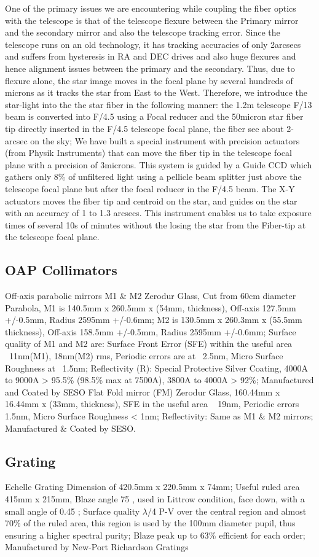 \documentclass[12pt,preprint]{emulateapj}
\begin{document}
One of the primary issues we are encountering while coupling the fiber optics with the telescope is
that of the telescope flexure between the Primary mirror and the secondary mirror and also the telescope
tracking error. Since the telescope runs on an old technology, it has tracking accuracies of only 2arcsecs
and suffers from hysteresis in RA and DEC drives and also huge flexures and hence alignment issues between
the primary and the secondary. Thus, due to flexure alone, the star image moves in the focal plane by several
hundreds of microns as it tracks the star from East to the West. Therefore, we introduce the star-light into the
the star fiber in the following manner: the 1.2m telescope F/13 beam is converted into F/4.5 using a Focal reducer 
and the 50micron star fiber tip directly inserted in the F/4.5 telescope focal plane, the fiber see about 2-arcsec on the sky;
We have built a special instrument with precision actuators (from Physik Instruments) that can move the fiber tip in the telescope focal plane with a precision of 3microns. This system is guided by a Guide CCD which gathers only 8\% of unfiltered light using 
a pellicle beam splitter just above the telescope focal plane but after the focal reducer in the F/4.5 beam. 
The X-Y actuators moves the fiber tip and centroid on the star, and guides on the star with an accuracy of 1 to 1.3 arcsecs.
This instrument enables us to take exposure times of several 10s of minutes without the losing the star from the 
Fiber-tip at the telescope focal plane.
\subsection{OAP Collimators}
Off-axis parabolic mirrors M1 \& M2 Zerodur Glass, Cut from 60cm diameter Parabola, M1 is 140.5mm x 260.5mm x (54mm, thickness), Off-axis 127.5mm +/-0.5mm, Radius 2595mm +/-0.6mm; M2 is 130.5mm x 260.3mm x (55.5mm thickness), Off-axis 158.5mm +/-0.5mm, Radius 2595mm +/-0.6mm;
Surface quality of M1 and M2 are: Surface Front Error (SFE) within the useful area ~11nm(M1), 18nm(M2) rms, Periodic errors are at ~2.5nm, Micro Surface Roughness at ~1.5nm; Reflectivity (R): Special Protective Silver Coating, 4000A to 9000A > 95.5\% (98.5\% max at 7500A), 3800A to 4000A > 92\%; Manufactured and Coated by SESO
Flat Fold mirror (FM)   Zerodur Glass, 160.44mm x 16.44mm x (33mm, thickness), SFE in the useful area ~ 19nm, Periodic errors ~ 1.5nm, Micro Surface Roughness < 1nm; Reflectivity: Same as M1 \& M2 mirrors; Manufactured \& Coated by SESO.
\subsection{Grating}
Echelle Grating Dimension of 420.5mm x 220.5mm x 74mm; Useful ruled area 415mm x 215mm, Blaze angle 75 , used in Littrow condition, face down, with a small   angle of 0.45 ;
Surface quality  $\lambda$/4 P-V over the central region and almost 70\% of the ruled area, this region is used by the 100mm diameter pupil, thus ensuring a higher spectral purity; Blaze peak up to 63\% efficient for each order; Manufactured by New-Port Richardson Gratings
\end{document}
